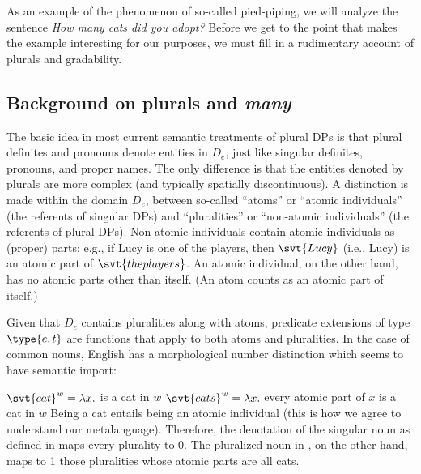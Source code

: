 As an example of the phenomenon of so-called pied-piping, we will analyze the
sentence \emph{How many cats did you adopt?} Before we get to the point that
makes the example interesting for our purposes, we must fill in a rudimentary
account of plurals and gradability.

\subsection{Background on plurals and \emph{many}}
\label{sec:backgr-plur-many}

The basic idea in most current semantic treatments of plural DPs is that plural
definites and pronouns denote entities in $D_{e}$, just like singular definites,
pronouns, and proper names. The only difference is that the entities denoted by
plurals are more complex (and typically spatially discontinuous). A distinction
is made within the domain $D_{e}$, between so-called ``atoms'' or ``atomic
individuals'' (the referents of singular DPs) and ``pluralities'' or
``non-atomic individuals'' (the referents of plural DPs). Non-atomic individuals
contain atomic individuals as (proper) parts; e.g., if Lucy is one of the
players, then $\svt{Lucy}$ (i.e., Lucy) is an atomic part of
$\svt{the players}$. An atomic individual, on the other hand, has no atomic
parts other than itself. (An atom counts as an atomic part of itself.)

Given that $D_{e}$ contains pluralities along with atoms, predicate extensions
of type $\type{e,t}$ are functions that apply to both atoms and pluralities. In
the case of common nouns, English has a morphological number distinction which
seems to have semantic import:

\pex
\a $\svt{cat}^{w} = \lambda x.$ is a cat in $w$
\a $\svt{cats}^{w} = \lambda x.$ every atomic part of $x$ is a cat in $w$
\xe
%
%
Being a cat entails being an atomic individual (this is how we agree to
understand our metalanguage). Therefore, the denotation of the singular noun as
defined in \Last[a] maps every plurality to 0. The pluralized noun in \Last[b],
on the other hand, maps to 1 those pluralities whose atomic parts are all cats.

